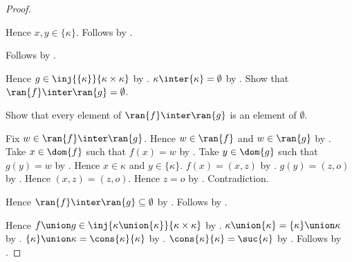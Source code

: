 \begin{proof}
\begin{subproof}
\begin{subproof}
            Hence $x,y\in\{\kappa\}$.
            Follows by .
        \end{subproof}
        Follows by .
    \end{subproof}
    Hence $g\in\inj{\{\kappa\}}{\kappa\times\kappa}$
        by .
    $\kappa\inter\{\kappa\}=\emptyset$
        by .
    Show that $\ran{f}\inter\ran{g}=\emptyset$.
    \begin{subproof}
        Show that every element of $\ran{f}\inter\ran{g}$ is an element
            of $\emptyset$.
        \begin{subproof}
            Fix $w\in\ran{f}\inter\ran{g}$.
            Hence $w\in\ran{f}$ and $w\in\ran{g}$ by .
            Take $x\in\dom{f}$ such that $f(x)=w$
                by .
            Take $y\in\dom{g}$ such that $g(y)=w$
                by .
            Hence $x\in\kappa$ and $y\in\{\kappa\}$.
            $f(x)=(x,z)$ by .
            $g(y)=(z,o)$
                by .
            Hence $(x,z)=(z,o)$.
            Hence $z=o$ by .
            Contradiction.
        \end{subproof}
        Hence $\ran{f}\inter\ran{g}\subseteq\emptyset$
            by .
        Follows by .
    \end{subproof}
    Hence $f\union g\in\inj{\kappa\union\{\kappa\}}{\kappa\times\kappa}$
        by .
    $\kappa\union\{\kappa\}=\{\kappa\}\union\kappa$
        by .
    $\{\kappa\}\union\kappa=\cons{\kappa}{\kappa}$
        by .
    $\cons{\kappa}{\kappa}=\suc{\kappa}$ by .
    Follows by \auto.
\end{proof}

